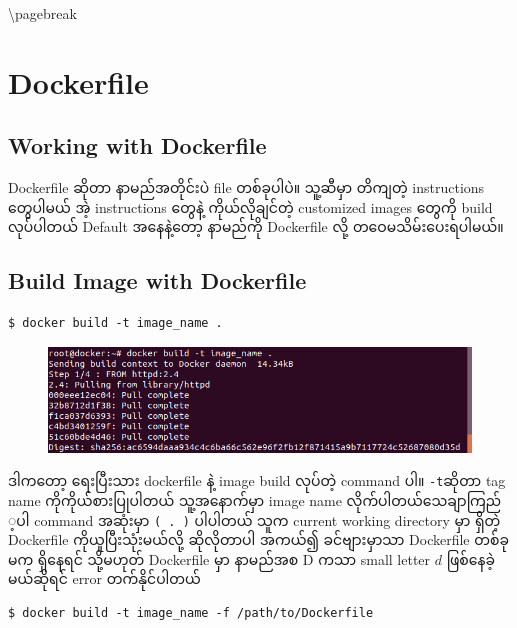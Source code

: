 \textbackslash{}pagebreak

\section{Dockerfile}\label{dockerfile}

\subsection{Working with Dockerfile}\label{working-with-dockerfile}

Dockerfile ဆိုတာ နာမည်​အတိုင်းပဲ file တစ်​ခုပါပဲ။ သူ့ဆီမှာ တိကျတဲ့
instructions ​တွေပါမယ်​ အဲ့ instructions ​တွေနဲ့ ကိုယ်​လိုချင်​တဲ့
customized images ​တွေကို​ build လုပ်​ပါတယ်​ Default အ​နေနဲ့​တော့
နာမည်​ကို Dockerfile လို့ တ​ဝေမသိမ်း​ပေးရပါမယ်​။

\subsection{Build Image with
Dockerfile}\label{build-image-with-dockerfile}

\begin{verbatim}
$ docker build -t image_name .
\end{verbatim}

\begin{figure}[htbp]
\centering
\includegraphics{.gitbook/assets/1_docker_build.png}
\end{figure}

ဒါက​တော့ ​ရေးပြီးသား dockerfile နဲ့ image build လုပ်​တဲ့ command ပါ။
\texttt{-t}ဆိုတာ tag name ကိုကိုယ်​စားပြုပါတယ်​ သူ့အ​နောက်​မှာ image
name လိုက်​ပါတယ်​ ​သေချာကြည်​့ပါ command အဆုံးမှာ \texttt{( . )}
ပါပါတယ်​ သူက current working directory မှာ ရှိတဲ့ Dockerfile
ကိုယူပြီးသုံးမယ်​လို့ ဆိုလိုတာပါ အကယ်​၍ ခင်​​ဗျားမှာသာ Dockerfile
တစ်​ခုမက ရှိ​နေရင်​ သို့မဟုတ်​ Dockerfile မှာ နာမည်​အစ D ကသာ small
letter $d$ ဖြစ်​​နေခဲ့မယ်​ဆိုရင်​ error တက်​နိုင်​ပါတယ်​

\begin{verbatim}
$ docker build -t image_name -f /path/to/Dockerfile
\end{verbatim}

